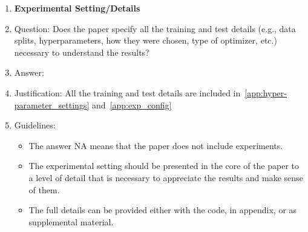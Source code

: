 \documentclass{article}
\begin{document}
\begin{enumerate}
\item {\bf Experimental Setting/Details}
    \item[] Question: Does the paper specify all the training and test details (e.g., data splits, hyperparameters, how they were chosen, type of optimizer, etc.) necessary to understand the results?
    \item[] Answer: \answerYes{} %
    \item[] Justification: All the training and test details are included in~\ref{app:hyper-parameter_settings} and~\ref{app:exp_config}
    \item[] Guidelines:
    \begin{itemize}
        \item The answer NA means that the paper does not include experiments.
        \item The experimental setting should be presented in the core of the paper to a level of detail that is necessary to appreciate the results and make sense of them.
        \item The full details can be provided either with the code, in appendix, or as supplemental material.
    \end{itemize}


\end{enumerate}
\end{document}
